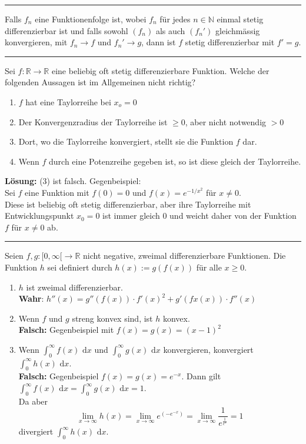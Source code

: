 \documentclass[a4paper,fontsize = 7pt]{scrartcl}
\def\limxi{\lim_{x\to\infty}}
\def\R{\mathbb{R}}
\def\N{\mathbb{N}}
\def\dx{\text{ d}x}
\begin{document}
\vspace{0.1 cm}
\hrule
\vspace{0.2 cm}

Falls $f_n$ eine Funktionenfolge ist, wobei $f_n$ für jedes $n \in \N$ einmal stetig differenzierbar ist und falls sowohl $(f_n)$ als auch $(f_n')$ gleichmässig konvergieren, mit $f_n \to f$ und $f_n' \to g$, dann ist $f$ stetig differenzierbar mit $f' = g$.

\vspace{0.1 cm}
\hrule
\vspace{0.2 cm}

Sei $f: \R \to \R$ eine beliebig oft stetig differenzierbare Funktion. Welche der folgenden Aussagen ist im Allgemeinen nicht richtig?
\begin{enumerate}
  \item $f$ hat eine Taylorreihe bei $x_o = 0$
  \item Der Konvergenzradius der Taylorreihe ist $\geq 0$, aber nicht notwendig $>0$
  \item Dort, wo die Taylorreihe konvergiert, stellt sie die Funktion $f$ dar.
  \item Wenn $f$ durch eine Potenzreihe gegeben ist, so ist diese gleich der Taylorreihe.
\end{enumerate}
\textbf{Lösung:} (3) ist falsch. Gegenbeispiel: 
\\Sei $f$ eine Funktion mit $f(0) = 0$ und $f(x)=e^{-1/x^2}$ für $x \neq 0$. 
\\Diese ist beliebig oft stetig differenzierbar, aber ihre Taylorreihe mit Entwicklungspunkt $x_0 = 0$ ist immer gleich $0$ und weicht daher von der Funktion $f$ für $x \neq 0$ ab.

\vspace{0.1 cm}
\hrule
\vspace{0.2 cm}

Seien $f, g: [0, \infty[ \to \R$ nicht negative, zweimal differenzierbare Funktionen. Die Funktion $h$ sei definiert durch $h(x) := g(f(x))$ für alle $x \geq 0$.
\begin{enumerate}
  \item $h$ ist zweimal differenzierbar.
  \\ \textbf{Wahr}: $h''(x) =  g''(f(x)) \cdot f'(x)^2 + g'(fx(x))\cdot f''(x)$
  \item Wenn $f$ und $g$ streng konvex sind, ist $h$ konvex.
  \\ \textbf{Falsch:} Gegenbeispiel mit $f(x) = g(x) = (x-1)^2$
  \item Wenn $\int_0^\infty f(x)\dx$ und $\int_0^\infty g(x)\dx$ konvergieren, konvergiert $\int_0^\infty h(x)\dx$.
  \\ \textbf{Falsch:} Gegenbeispiel $f(x) = g(x) = e^{-x}$. Dann gilt $\int_0^\infty f(x)\dx=\int_0^\infty g(x)\dx = 1$.
  \\Da aber $$\limxi h(x) = \limxi e^{(-e^{-x})} = \limxi \frac{1}{e^{\frac{1}{e^x}}} = 1$$ divergiert $\int_0^\infty h(x) \dx$.
\end{enumerate}
\end{document}
